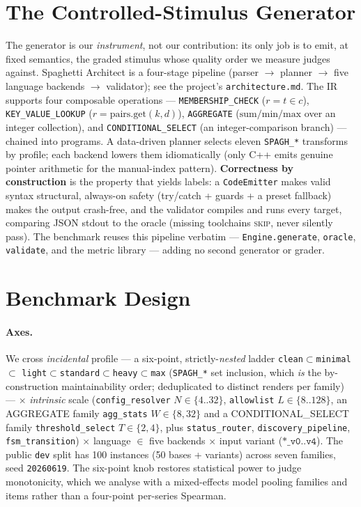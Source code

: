 \documentclass[11pt]{article}
\begin{document}
\section{The Controlled-Stimulus Generator}
The generator is our \emph{instrument}, not our contribution: its only job is to emit, at
fixed semantics, the graded stimulus whose quality order we measure judges against.
Spaghetti Architect is a four-stage pipeline (parser $\to$ planner $\to$ five
language backends $\to$ validator); see the project's \texttt{architecture.md}. The
IR supports four composable operations --- \texttt{MEMBERSHIP\_CHECK} ($r = t \in c$),
\texttt{KEY\_VALUE\_LOOKUP} ($r = \text{pairs}.\text{get}(k,d)$), \texttt{AGGREGATE}
($\mathrm{sum}/\mathrm{min}/\mathrm{max}$ over an integer collection), and
\texttt{CONDITIONAL\_SELECT} (an integer-comparison branch) --- chained into
programs. A data-driven planner selects eleven \texttt{SPAGH\_*} transforms by
profile; each backend lowers them idiomatically (only C++ emits genuine pointer
arithmetic for the manual-index pattern). \textbf{Correctness by construction} is the
property that yields labels: a \texttt{CodeEmitter} makes valid syntax structural,
always-on safety (try/catch + guards + a preset fallback) makes the output crash-free,
and the validator compiles and runs every target, comparing JSON stdout to the oracle
(missing toolchains \textsc{skip}, never silently pass). The benchmark reuses this
pipeline verbatim --- \texttt{Engine.generate}, \texttt{oracle}, \texttt{validate},
and the metric library --- adding no second generator or grader.

\section{Benchmark Design}\label{sec:design}
\paragraph{Axes.} We cross \emph{incidental} profile --- a six-point,
strictly-\emph{nested} ladder \texttt{clean}$\subset$\texttt{minimal}$\subset$%
\texttt{light}$\subset$\texttt{standard}$\subset$\texttt{heavy}$\subset$\texttt{max}
(\texttt{SPAGH\_*} set inclusion, which \emph{is} the by-construction maintainability
order; deduplicated to distinct renders per family) --- $\times$ \emph{intrinsic}
scale (\texttt{config\_resolver} $N\!\in\!\{4..32\}$, \texttt{allowlist}
$L\!\in\!\{8..128\}$, an AGGREGATE family \texttt{agg\_stats} $W\!\in\!\{8,32\}$ and a
CONDITIONAL\_SELECT family \texttt{threshold\_select} $T\!\in\!\{2,4\}$, plus
\texttt{status\_router}, \texttt{discovery\_pipeline}, \texttt{fsm\_transition})
$\times$ language $\in$ five backends $\times$ input variant ($\texttt{*\_v0..v4}$).
The public \texttt{dev} split has 100 instances (50 bases + variants)
across seven families, seed \texttt{20260619}. The six-point knob restores statistical
power to judge monotonicity, which we analyse with a mixed-effects model pooling
families and items rather than a four-point per-series Spearman.
\end{document}

